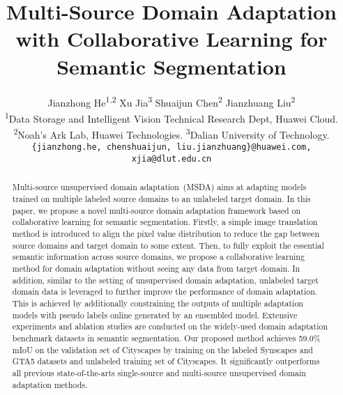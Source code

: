\documentclass[final]{cvpr}
\begin{document}
\title{Multi-Source Domain Adaptation with Collaborative Learning for Semantic Segmentation}

\author{Jianzhong He\textsuperscript{1,2}\quad
Xu Jia\textsuperscript{3}\footnotemark[1]\quad
Shuaijun Chen\textsuperscript{2}\quad
Jianzhuang Liu\textsuperscript{2}\\
\textsuperscript{1}Data Storage and Intelligent Vision Technical Research Dept, Huawei Cloud.\\
\textsuperscript{2}Noah's Ark Lab, Huawei Technologies.
\textsuperscript{3}Dalian University of Technology.\\
{\tt\small \{jianzhong.he, chenshuaijun, liu.jianzhuang\}@huawei.com, xjia@dlut.edu.cn}\\
}


\maketitle

\renewcommand{\thefootnote}{\fnsymbol{footnote}}


\begin{abstract}
	Multi-source unsupervised domain adaptation~(MSDA) aims at adapting models trained on multiple labeled source domains to an unlabeled target domain. In this paper, we propose a novel multi-source domain adaptation framework based on collaborative learning for semantic segmentation. Firstly, a simple image translation method is introduced to align the pixel value distribution to reduce the gap between source domains and target domain to some extent. Then, to fully exploit the essential semantic information across source domains, we propose a collaborative learning method for domain adaptation without seeing any data from target domain. In addition, similar to the setting of unsupervised domain adaptation, unlabeled target domain data is leveraged to further improve the performance of domain adaptation. This is achieved by additionally constraining the outputs of multiple adaptation models with pseudo labels online generated by an ensembled model. Extensive experiments and ablation studies are conducted on the widely-used domain adaptation benchmark datasets in semantic segmentation. Our proposed method achieves 59.0\% mIoU on the validation set of Cityscapes by training on the labeled Synscapes and GTA5 datasets and unlabeled training set of Cityscapes. It significantly outperforms all previous state-of-the-arts single-source and multi-source unsupervised domain adaptation methods.
\end{abstract}
\end{document}
